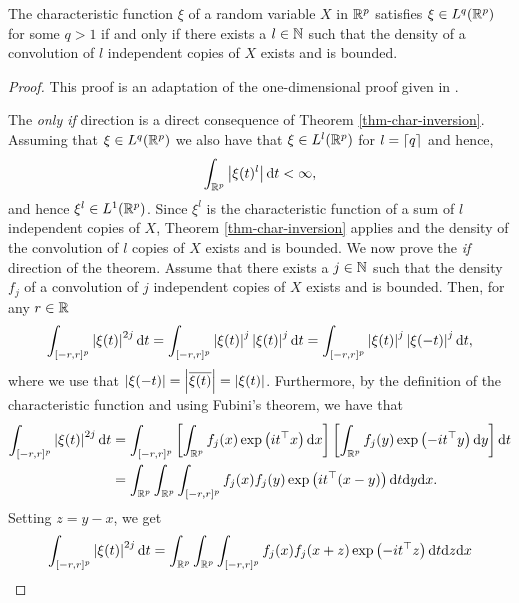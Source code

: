 \begin{lemma} \label{lem-char-integrable-convolution}
    The characteristic function $\xi$ of a random variable $X$ in $\Rp$ satisfies $\xi \in L^q(\Rp)$ for some $q > 1$ if and only if there exists a $l \in \N$ such that the density of a convolution of $l$ independent copies of $X$ exists and is bounded.
\end{lemma}
\begin{proof}
    This proof is an adaptation of the one-dimensional proof given in \cite[Lemma 2.4.4]{kolassa2006series}.

    The \textit{only if} direction is a direct consequence of Theorem \ref{thm-char-inversion}. Assuming that $\xi \in L^q(\Rp)$ we also have that $\xi \in L^l(\Rp)$ for $l = \ceil{q}$ and hence,
    \begin{equation*}
        \intRp{t}{\abs{\xi(t)^l}} < \infty,
    \end{equation*}
    and hence $\xi^l \in L^1(\Rp)$. Since $\xi^l$ is the characteristic function of a sum of $l$ independent copies of $X$, Theorem \ref{thm-char-inversion} applies and the density of the convolution of $l$ copies of $X$ exists and is bounded.
    \newline
    We now prove the \textit{if} direction of the theorem. Assume that there exists a $j \in \N$ such that the density $f_j$ of a convolution of $j$ independent copies of $X$ exists and is bounded. Then, for any $r \in \R$
    \begin{equation*}
        \int_{[-r, r]^p} \abs{\xi(t)}^{2j} \d t
        = \int_{[-r, r]^p} \abs{\xi(t)}^j\abs{\xi(t)}^j \d t
        = \int_{[-r, r]^p} \abs{\xi(t)}^j\abs{\xi(-t)}^j \d t,
    \end{equation*}
    where we use that $\abs{\xi(-t)} = \abs{\overline{\xi(t)}} = \abs{\xi(t)}$. Furthermore, by the definition of the characteristic function and using Fubini's theorem, we have that
    \begin{align*}
        \int_{[-r, r]^p} \abs{\xi(t)}^{2j} \d t
        &= \int_{[-r, r]^p} \left[\intRp{x}{f_j(x)\expf{it^\top x}}\right]\left[\intRp{y}{f_j(y)\expf{-it^\top y}}\right] \d t\\
        &= \intRp{x}{\intRp{y}{\int_{[-r, r]^p} f_j(x)f_j(y)\expf{it^\top (x - y)}\d t}}.
    \end{align*}
    Setting $z = y - x$, we get
    \begin{align*}
        \int_{[-r, r]^p} \abs{\xi(t)}^{2j} \d t
        &= \intRp{x}{\intRp{z}{\int_{[-r, r]^p} f_j(x)f_j(x + z)\expf{-it^\top z}\d t}}\\

\end{align*}
\end{proof}

